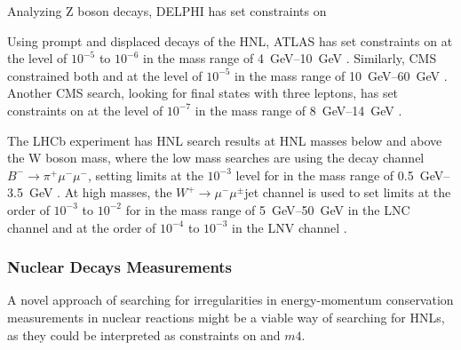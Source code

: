 Analyzing Z boson decays, DELPHI has set constraints on 

Using prompt and displaced decays of the HNL, ATLAS has set constraints on  at the level of $10^{-5}$ to $10^{-6}$ in the mass range of \SIrange{4}{10}{\giga\electronvolt} . Similarly, CMS constrained both  and  at the level of $10^{-5}$ in the mass range of \SIrange{10}{60}{\giga\electronvolt} . Another CMS search, looking for final states with three leptons, has set constraints on  at the level of $10^{-7}$ in the mass range of \SIrange{8}{14}{\giga\electronvolt} .

The LHCb experiment has HNL search results at HNL masses below and above the W boson mass, where the low mass searches are using the decay channel $B^- \rightarrow \pi^+ \mu^- \mu^-$, setting limits at the $10^{-3}$ level for  in the mass range of \SIrange{0.5}{3.5}{\giga\electronvolt} . At high masses, the $W^+ \rightarrow \mu^- \mu^\pm$jet channel is used to set limits at the order of $10^{-3}$ to $10^{-2}$ for  in the mass range of \SIrange{5}{50}{\giga\electronvolt} in the LNC channel and at the order of $10^{-4}$ to $10^{-3}$ in the LNV channel .






\subsubsection{Nuclear Decays Measurements}

A novel approach of searching for irregularities in energy-momentum conservation measurements in nuclear reactions might be a viable way of searching for HNLs, as they could be interpreted as constraints on  and $m4$.

